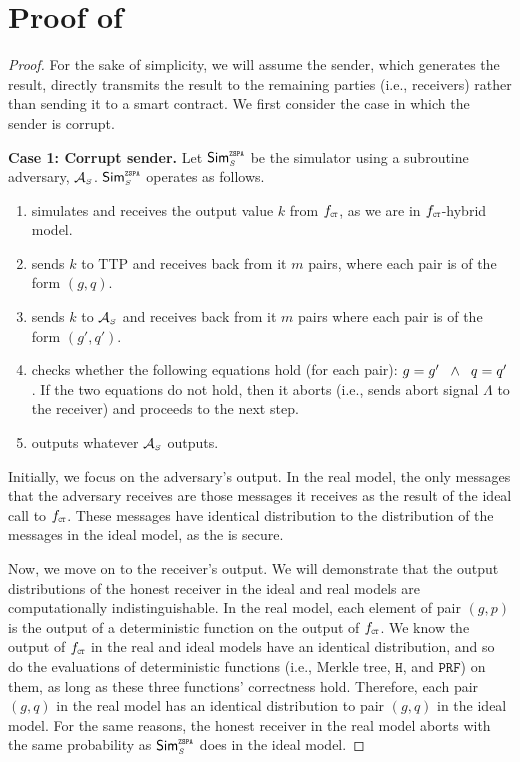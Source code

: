 


\section{Proof of \zspa}\label{sec::proof-of-zspa}


\begin{proof}
For the sake of simplicity, we will assume the sender, which generates the result, directly transmits the result  to the remaining parties (i.e., receivers) rather than sending it to a smart contract. We first consider the case in which the sender is corrupt. 



\noindent\textbf{Case 1: Corrupt sender.}  Let $\mathsf{Sim}^{\scriptscriptstyle \mathtt{ZSPA}}_{\scriptscriptstyle S}$ be the simulator using a subroutine adversary, $\mathcal{A}_{\scriptscriptstyle S}$. $\mathsf{Sim}^{\scriptscriptstyle \mathtt{ZSPA}}_{\scriptscriptstyle S}$ operates as follows. 
%
\begin{enumerate}
%
\item simulates  \ct  and receives the output value $k$ from $f_{\scriptscriptstyle \mathtt{CT}}$, as we are in $f_{\scriptscriptstyle \mathtt{CT}}$-hybrid model.
%
\item sends $k$ to TTP and receives back from it $m$ pairs, where each pair is of the form $( g,  q)$. 
%
\item sends $ k$ to $\mathcal{A}_{\scriptscriptstyle S}$ and receives back from it $m$ pairs  where each pair is of the form $( g',  q')$. 
%
\item checks whether the following equations hold (for each pair): $ g= g' \hspace{2mm} \wedge  \hspace{2mm}  q= q'$. If the two equations do not hold, then it aborts (i.e., sends abort signal $\Lambda$ to the receiver) and proceeds to the next step.
%
\item outputs whatever $\mathcal{A}_{\scriptscriptstyle S}$ outputs.
%
 \end{enumerate}
 
 Initially, we focus on the adversary’s output. In the real model, the only messages that the adversary receives are those messages it receives as the result of the ideal call to $f_{\scriptscriptstyle \mathtt{CT}}$. These messages have identical distribution to the distribution of the messages in the ideal model, as the \ct is secure. 
 
 Now, we move on to the receiver’s output. We will demonstrate that the output distributions of the honest receiver in the ideal and real models are computationally indistinguishable. In the real model,  each element of pair $(g, p)$ is the output of a deterministic function on the output of $f_{\scriptscriptstyle \mathtt{CT}}$. We know the output of $f_{\scriptscriptstyle \mathtt{CT}}$ in the real and ideal models have an identical distribution, and so do the evaluations of deterministic functions (i.e., Merkle tree, $\mathtt{H}$, and $\mathtt{PRF}$) on them, as long as these three functions' correctness hold. Therefore, each pair $(g,q)$ in the real model has an identical distribution to pair $(g,  q)$ in the ideal model.  For the same reasons, the honest receiver in the real model aborts with the same probability as  $\mathsf{Sim}^{\scriptscriptstyle \mathtt{ZSPA}}_{\scriptscriptstyle S}$ does in the ideal model.  
 

\end{proof}

